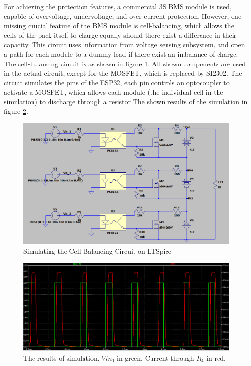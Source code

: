 For achieving the protection features, a commercial 3S BMS module is used, capable of overvoltage, undervoltage, and over-current protection. However, one missing crucial feature of the BMS module is cell-balancing, which allows the cells of the pack itself to charge equally should there exist a difference in their capacity. This circuit uses information from voltage sensing subsystem, and open a path for each module to a dummy load if there exist an imbalance of charge.
\newline The cell-balancing circuit is as shown in figure \ref{fig:hw-balance-circuit}. All shown components are used in the actual circuit, except for the MOSFET, which is replaced by SI2302. The circuit simulates the pins of the ESP32, each pin controls an optocoupler to activate a MOSFET, which allows each module (the individual cell in the simulation) to discharge through a resistor The shown results of the simulation in figure \ref{fig:hw-balance-results}.


\begin{figure}[h!]
    \centering
    \includegraphics[scale=0.4]{./Figures/HW/simulation-balance.png}
    \caption{Simulating the Cell-Balancing Circuit on LTSpice}
    \label{fig:hw-balance-circuit}
\end{figure}

\newpage
\begin{figure}[h!]
    \centering
    \includegraphics[scale=0.3]{./Figures/HW/results-balance.png}
    \caption{The results of simulation. $Vin_1$ in green, Current through $R_4$ in red.}
    \label{fig:hw-balance-results}
\end{figure}

